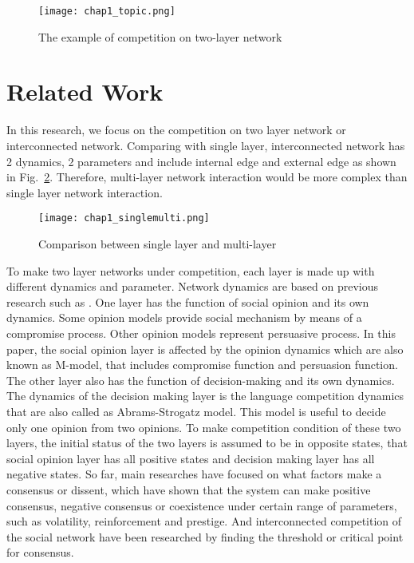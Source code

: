 \begin{figure}[!htb]
	\centering
	\texttt{[image: chap1\_topic.png]}
	\caption{The example of competition on two-layer network}
	\label{chap1_topic}
\end{figure}

\section{Related Work}
In this research, we focus on the competition on two layer network or interconnected network. Comparing with single layer, interconnected network has 2 dynamics, 2 parameters and include internal edge and external edge as shown in Fig.~\ref{chap1_singlemulti}. Therefore, multi-layer network interaction would be more complex than single layer network interaction.
\begin{figure}[!htb]
	\centering
	\texttt{[image: chap1\_singlemulti.png]}
	\caption{Comparison between single layer and multi-layer}
	\label{chap1_singlemulti}
\end{figure}
To make two layer networks under competition, each layer is made up with different dynamics and parameter. Network dynamics are based on previous research such as \parencite{alvarez2016}. One layer has the function of social opinion and its own dynamics. Some opinion models provide social mechanism by means of a compromise process.\parencite{naim2003} Other opinion models represent persuasive process.\parencite{chau2014} In this paper, the social opinion layer is affected by the opinion dynamics which are also known as M-model\parencite{rocca2014}, that includes compromise function and persuasion function. The other layer also has the function of decision-making and its own dynamics. The dynamics of the decision making layer is the language competition dynamics that are also called as Abrams-Strogatz model\parencite{abrams2003, vazquez2010, patriarca2012}. This model is useful to decide only one opinion from two opinions. To make competition condition of these two layers, the initial status of the two layers is assumed to be in opposite states, that social opinion layer has all positive states and decision making layer has all negative states.
So far, main researches have focused on what factors make a consensus or dissent, which have shown that the system can make positive consensus, negative consensus or coexistence under certain range of parameters, such as volatility, reinforcement and prestige.\parencite{alvarez2016} And interconnected competition of the social network have been researched by finding the threshold or critical point for consensus.\parencite{alvarez2016, gomez2015, diep2017}
